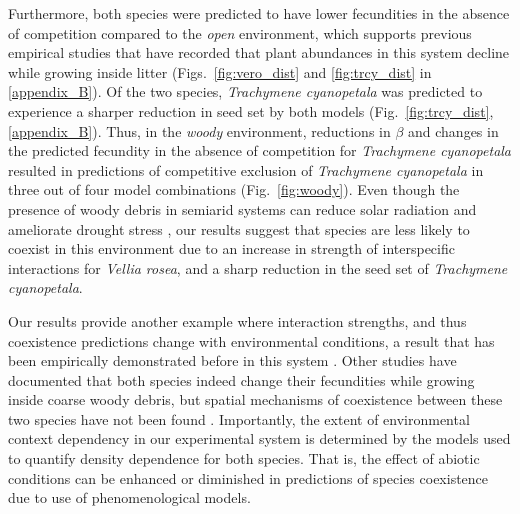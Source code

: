 \begin{refsection}
Furthermore, both species were predicted to have lower fecundities in the absence of competition compared to the \textit{open} environment, which supports previous empirical studies that have recorded that plant abundances in this system decline while growing inside litter \citep{wainwright2017effects} (Figs.~\ref{fig:vero_dist} and \ref{fig:trcy_dist} in \autoref{appendix_B}). Of the two species, \textit{Trachymene cyanopetala} was predicted to experience a sharper reduction in seed set by both models (Fig.~\ref{fig:trcy_dist},\autoref{appendix_B}). Thus, in the \textit{woody} environment, reductions in $\beta$ and changes in the predicted fecundity in the absence of competition for \textit{Trachymene cyanopetala} resulted in predictions of competitive exclusion of \textit{Trachymene cyanopetala} in three out of four model combinations (Fig.~\ref{fig:woody}). Even though the presence of woody debris in semiarid systems can reduce solar radiation and ameliorate drought stress \citep{wainwright2017effects}, our results suggest that species are less likely to coexist in this environment due to an increase in strength of interspecific interactions for \textit{Vellia rosea}, and a sharp reduction in the seed set of \textit{Trachymene cyanopetala}.

Our results  provide another example where interaction strengths, and thus coexistence predictions change with environmental conditions, a result that has been empirically demonstrated before in this system \citep{mayfield2017higher,wainwright2017diverse,bimler_accurate_2018}. Other studies have documented that both species indeed change their fecundities while growing inside coarse woody debris, but spatial mechanisms of coexistence between these two species have not been found \citep{towers2020requirements}. Importantly, the extent of environmental context dependency in our experimental system is determined by the models used to quantify density dependence for both species. That is, the effect of abiotic conditions can be enhanced or diminished in predictions of species coexistence due to use of phenomenological models.





\end{refsection}

